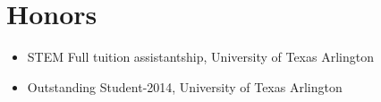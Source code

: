 \documentclass{my_cv}
\begin{document}
\section{{Honors}} 

\vspace{-5pt} %
\begin{itemize} \itemsep -2pt 
\item STEM Full tuition assistantship, University of Texas Arlington \\
\item Outstanding Student-2014, University of Texas Arlington \\
\end{itemize}
\end{document}
